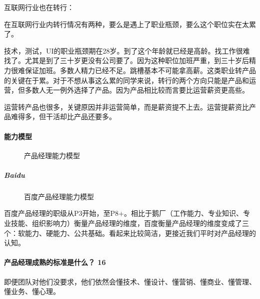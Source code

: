 \documentclass[letterpaper,11pt,english]{sphinxmanual}
\begin{document}
互联网行业也在转行：

在互联网行业内转行情况有两种，要么是遇上了职业瓶颈，要么这个职位实在太累了。

技术，测试，UI的职业瓶颈期在28岁。到了这个年龄就已经是高龄。找工作很难找了。尤其是到了三十岁更没有公司要了。因为这种职位加班严重，到三十岁后精力很难保证加班。多数人精力已经不足。跳槽基本不可能拿高薪。这类职业转产品的关键在于累。对于不想从事这么累的同学来说，转行的两个方向只能是产品和运营，但多数人无一例外选择了产品。因为产品相比较而言要比运营薪资更高些。

运营转产品也很多，关键原因并非运营简单，而是薪资提不上去。运营提薪资比产品难得多，但干活却比产品还要多。


\paragraph{能力模型}
\label{\detokenize{chapter_introduction/PM:id62}}
\begin{figure}[H]
\centering
\capstart

\noindent{}
\caption{产品经理能力模型}\label{\detokenize{chapter_introduction/PM:id75}}\end{figure}


\subparagraph{Baidu}
\label{\detokenize{chapter_introduction/PM:baidu}}
\begin{figure}[H]
\centering
\capstart

\noindent{}
\caption{百度\sphinxhyphen{}产品经理能力模型\sphinxfootnotemark[173]}\label{\detokenize{chapter_introduction/PM:id76}}\end{figure}
%
\begin{footnotetext}[173]\sphinxAtStartFootnote
{}
%
\end{footnotetext}\ignorespaces 
百度产品经理的职级从P3开始，至P8+。相比于鹅厂（工作能力、专业知识、专业技能、组织影响力）衡量产品经理的维度，百度衡量产品经理的维度变成了三个：软能力、硬能力、公共基础。看起来比较简洁，更接近我们平时对产品经理的认知。


\paragraph{产品经理成熟的标准是什么？ 16\sphinxfootnotemark[174]}
\label{\detokenize{chapter_introduction/PM:id63}}%
\begin{footnotetext}[174]\sphinxAtStartFootnote
{}
%
\end{footnotetext}\ignorespaces 
即便团队对他们没要求，他们依然会懂技术、懂设计、懂营销、懂商业、懂管理、懂业务、懂心理。
\end{document}

